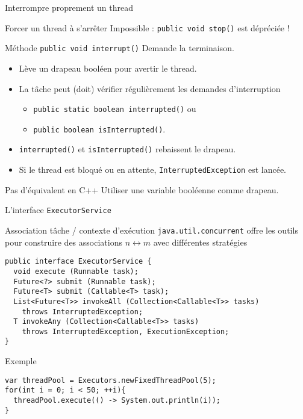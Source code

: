 \begin{frame}[fragile]{Interrompre proprement un thread}

  \begin{alertblock}{Forcer un thread à s'arrêter}
  Impossible : \lstinline|public void stop()| est dépréciée !
  \end{alertblock}
  \vfill
  \begin{block}{Méthode \lstinline|public void interrupt()|}
    Demande la terminaison.
    \begin{itemize}
    \item Lève un drapeau booléen pour avertir le thread.
    \item La tâche peut (doit) vérifier régulièrement les demandes d'interruption
    \begin{itemize}
    \item \lstinline|public static boolean interrupted()| ou
    \item \lstinline|public boolean isInterrupted()|.
    \end{itemize}
  \item \lstinline|interrupted()| et \lstinline|isInterrupted()| rebaissent le drapeau.
  \item Si le thread est bloqué ou en attente,  \lstinline|InterruptedException| est lancée.
    \end{itemize}
  \end{block}
  \vfill
  \begin{exampleblock}{Pas d'équivalent en C++}
    Utiliser une variable booléenne comme drapeau.
  \end{exampleblock}
\end{frame}



\begin{frame}[fragile]{L'interface \texttt{ExecutorService}}

\begin{block}{Association tâche / contexte d'exécution}
  \texttt{java.util.concurrent} offre les outils pour construire  des associations $n \leftrightarrow m$ avec différentes stratégies

  \begin{lstlisting}
public interface ExecutorService {
  void execute (Runnable task);
  Future<?> submit (Runnable task);
  Future<T> submit (Callable<T> task);
  List<Future<T>> invokeAll (Collection<Callable<T>> tasks)
    throws InterruptedException;
  T invokeAny (Collection<Callable<T>> tasks)
    throws InterruptedException, ExecutionException;
}
  \end{lstlisting}
\end{block}

  \begin{exampleblock}{Exemple}
  \begin{lstlisting}
var threadPool = Executors.newFixedThreadPool(5);
for(int i = 0; i < 50; ++i){
  threadPool.execute(() -> System.out.println(i));
}
  \end{lstlisting}
  \end{exampleblock}
  
\end{frame}


